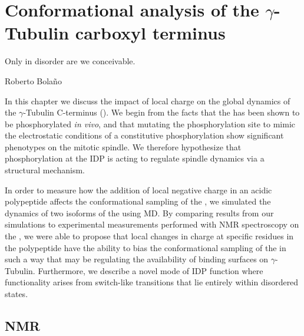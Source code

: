 \chapter{Conformational analysis of the $\gamma$-Tubulin carboxyl terminus}

\epigraph{Only in disorder are we conceivable.}{Roberto Bola\~no}

In this chapter we discuss the impact of local charge on the global dynamics of the $\gamma$-Tubulin C-terminus (\gct{}). We begin from the facts that the \gct{} has been shown to be phosphorylated {\it in vivo}, and that mutating the phosphorylation site to mimic the electrostatic conditions of a constitutive phosphorylation show significant phenotypes on the mitotic spindle. We therefore hypothesize that phosphorylation at the \gct{} IDP is acting to regulate spindle dynamics via a structural mechanism.

In order to measure how the addition of local negative charge in an acidic polypeptide affects the conformational sampling of the \gct{}, we simulated the dynamics of two isoforms of the \gct{} using MD. By comparing results from our simulations to experimental measurements performed with NMR spectroscopy on the \gct{}, we were able to propose that local changes in charge at specific residues in the polypeptide have the ability to bias the conformational sampling of the \gct{} in such a way that may be regulating the availability of binding surfaces on $\gamma$-Tubulin. Furthermore, we describe a novel mode of IDP function where functionality arises from switch-like transitions that lie entirely within disordered states.

\section{NMR}

